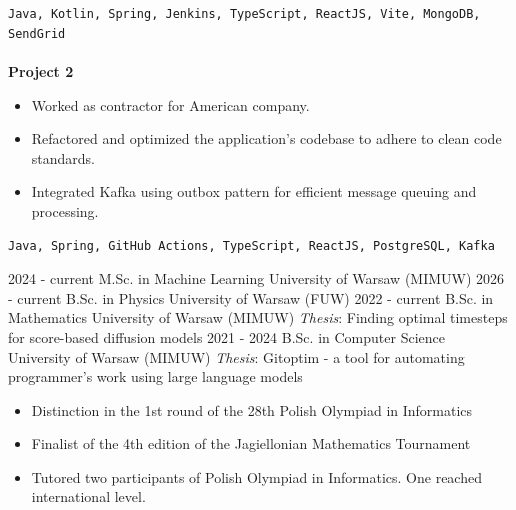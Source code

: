 \documentclass[8pt]{developercv} %
\begin{document}
\begin{entrylist}
{        \vspace{2mm}
        \texttt{Java, Kotlin, Spring, Jenkins, TypeScript, ReactJS, Vite, MongoDB, SendGrid}
        \\\\
        \textbf{\small Project 2}\\
        \vspace{-10pt}
        \begin{itemize}[noitemsep,topsep=0pt,parsep=0pt,partopsep=0pt, leftmargin=-1pt]
            \item Worked as contractor for American company.
            \item Refactored and optimized the application's codebase to adhere to clean code standards.
            \item Integrated Kafka using outbox pattern for efficient message queuing and processing.
        \end{itemize}
        \vspace{2mm}
        \texttt{Java, Spring, GitHub Actions, TypeScript, ReactJS, PostgreSQL, Kafka}}

\end{entrylist}

\vspace{-20 pt}
\begin{entrylist}
    \entry
		{2024 - current}
		{M.Sc. in Machine Learning}
		{University of Warsaw (MIMUW)}
		{}
    \entry
		{2026 - current}
		{B.Sc. in Physics}
		{University of Warsaw (FUW)}
		{}
    \entry
		{2022 - current}
		{B.Sc. in Mathematics }
		{University of Warsaw (MIMUW)}
		{\textsl{Thesis}: Finding optimal timesteps for score-based diffusion models}
    \entry
		{2021 - 2024}
		{B.Sc. in Computer Science}
		{University of Warsaw (MIMUW)}
		{\textsl{Thesis}: Gitoptim - a tool for automating programmer's work using large language models}
\end{entrylist}

\vspace{-20 pt}
\vspace{-10 pt}
\begin{itemize}[parsep=0pt,partopsep=0pt,leftmargin=26mm]
    \item Distinction in the 1st round of the 28th Polish Olympiad in Informatics
    \item Finalist of the 4th edition of the Jagiellonian Mathematics Tournament
    \item Tutored two participants of Polish Olympiad in Informatics. One reached international level.
\end{itemize}
 
\end{document}
